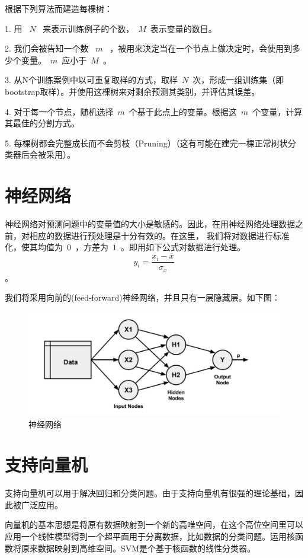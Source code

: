 \documentclass{article}\usepackage[]{graphicx}\usepackage[]{color}
\begin{document}
\begin{CJK*}{UTF8}{gkai}
根据下列算法而建造每棵树：

1. 用 ~$N$~ 来表示训练例子的个数，~$M$~表示变量的数目。

2. 我们会被告知一个数 ~$m$~ ，被用来决定当在一个节点上做决定时，会使用到多少个变量。~$m$~应小于~$M$~。

3. 从N个训练案例中以可重复取样的方式，取样~$N$~次，形成一组训练集（即bootstrap取样）。并使用这棵树来对剩余预测其类别，并评估其误差。

4. 对于每一个节点，随机选择~$m$~个基于此点上的变量。根据这~$m$~个变量，计算其最佳的分割方式。

5. 每棵树都会完整成长而不会剪枝（Pruning）（这有可能在建完一棵正常树状分类器后会被采用）。

\section{神经网络}
神经网络对预测问题中的变量值的大小是敏感的。因此，在用神经网络处理数据之前，对相应的数据进行预处理是十分有效的。在这里， 我们将对数据进行标准化，使其均值为~$0$~，方差为~$1$~。即用如下公式对数据进行处理。
$$y_i = \frac{x_i - \overline{x}}{\sigma_x}$$。

我们将采用向前的(feed-forward)神经网络，并且只有一层隐藏层。如下图：
\begin{figure}[ht]
\centering
\includegraphics[width = 12cm]{./art.jpeg}
\caption{神经网络}\label{fig2.1}
\end{figure}
\section{支持向量机}
支持向量机可以用于解决回归和分类问题。由于支持向量机有很强的理论基础，因此被广泛应用。


向量机的基本思想是将原有数据映射到一个新的高唯空间，在这个高位空间里可以应用一个线性模型得到一个超平面用于分离数据，比如数据的分类问题。运用核函数将原来数据映射到高维空间。SVM是个基于核函数的线性分类器。


\end{CJK*}
\end{document}
